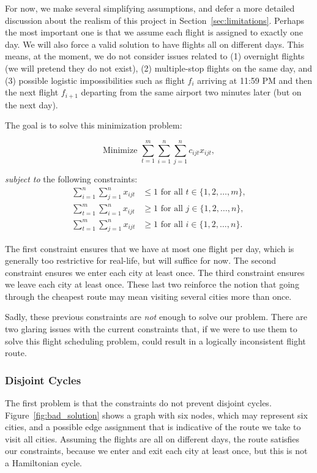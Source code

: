 \documentclass{article}
\begin{document}
For now, we make several simplifying assumptions, and defer a more detailed discussion about the realism of this project in
Section~\ref{sec:limitations}. Perhaps the most important one is that we assume each flight is assigned to exactly one day. We will also force a valid
solution to have flights all on different days. This means, at the moment, we do not consider issues related to (1) overnight flights (we will pretend
they do not exist), (2) multiple-stop flights on the same day, and (3) possible logistic impossibilities such as flight $f_i$ arriving at 11:59 PM and
then the next flight $f_{i+1}$ departing from the same airport two minutes later (but on the next day).

The goal is to solve this minimization problem:

\begin{equation}
\mbox{Minimize } \sum_{t=1}^{m} \sum_{i=1}^{n} \sum_{j=1}^{n} c_{ijt}x_{ijt},
\end{equation}

\emph{subject to} the following constraints:
\begin{align}
\sum_{i=1}^{n} \sum_{j=1}^{n} x_{ijt} &\le 1 \mbox{ for all } t \in \{1, 2, \ldots, m\}, \\ 
\sum_{t=1}^{m} \sum_{i=1}^{n} x_{ijt} &\ge 1 \mbox{ for all } j \in \{1, 2, \ldots, n\}, \\
\sum_{t=1}^{m} \sum_{j=1}^{n} x_{ijt} &\ge 1 \mbox{ for all } i \in \{1, 2, \ldots, n\}.
\end{align}

The first constraint ensures that we have at most one flight per day, which is generally too restrictive for real-life, but will suffice for now. The
second constraint ensures we enter each city at least once. The third constraint ensures we leave each city at least once. These last two reinforce
the notion that going through the cheapest route may mean visiting several cities more than once.

Sadly, these previous constraints are \emph{not} enough to solve our problem. There are two glaring issues with the current constraints that, if we
were to use them to solve this flight scheduling problem, could result in a logically inconsistent flight route.

\subsubsection{Disjoint Cycles}\label{sec:disjoint_cycles}

The first problem is that the constraints do not prevent disjoint cycles. Figure~\ref{fig:bad_solution} shows a graph with six nodes, which may
represent six cities, and a possible edge assignment that is indicative of the route we take to visit all cities. Assuming the flights are all on
different days, the route satisfies our constraints, because we enter and exit each city at least once, but this is not a Hamiltonian cycle.
\end{document}
